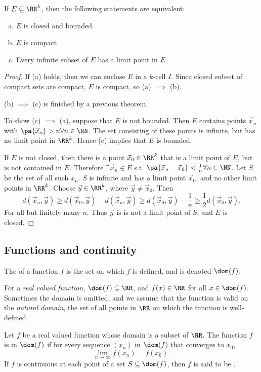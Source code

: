 \documentclass[11pt]{scrartcl}
\numberwithin{equation}{section}
\begin{document}
\begin{theorem}
    \label{thm:heineborelthm}
    If $E\subseteq \RR^k$, then the following statements are equivalent:
    \begin{enumerate}[(a)]
        \item $E$ is closed and bounded.
        \item $E$ is compact 
        \item Every infinite subset of $E$ has a limit point in $E$.
    \end{enumerate}
\end{theorem}
\begin{proof}
    If (a) holds, then we can enclose $E$ in a $k$-cell $I$.
    Since closed subset of compact sets are compact, $E$ is compact,
    so (a) $\implies$ (b).

    (b) $\implies$ (c) is finished by a previous theorem.

    To show (c) $\implies$ (a), suppose that $E$ is not bounded.
    Then $E$ contains points $\vec{x}_n$ with 
    $\pa{\vec{x}_n}>n\forall n \in \NN$. The set consisting of 
    these points is infinite, but has no limit point in $\RR^k$.
    Hence (c) implies that $E$ is bounded. 
    
    If $E$ is not closed, 
    then there is a point $\vec{x}_0\in \RR^k$ that is a limit point of $E$,
    but is not contained in $E$. Therefore $\exists \vec{x}_n\in E$ s.t.
    $\pa{\vec{x}_n-\vec{x}_0}<\frac{1}{n}\forall n \in \NN$.
    Let $S$ be the set of all such $x_n$.
    $S$ is infinite and has a limit point $\vec{x}_0$, and no other limit points in $\RR^k$. Choose $\vec{y}\in\RR^k$, where $\vec{y}\neq \vec{x}_0$.
    Then 
    \[ d(\vec{x}_n,\vec{y})\geq d(\vec{x}_0,\vec{y})-d(\vec{x}_n,\vec{y})
    \geq d(\vec{x}_0,\vec{y})-\frac{1}{n}\geq \frac{1}{2}d(\vec{x}_0,\vec{y}).\]
    For all but finitely many $n$. Thus $\vec{y}$ is is not a limit point of 
    $S$, and $E$ is closed.
\end{proof}
\subsection{Functions and continuity}
\begin{definition}
    The  of a function $f$ is the set on which $f$ is defined,
    and is denoted $\dom(f)$.
\end{definition}
For a \textit{real valued function}, $\dom(f)\subseteq \RR$, and $f(x)\in\RR$ for 
all $x\in\dom(f)$. Sometimes the domain is omitted, and we 
assume that the function is valid on the \textit{natural domain},
the set of all points in $\RR$ on which the function is well-defined.
\begin{definition}
    Let $f$ be a real valued function whose domain is a subset of $\RR$.
    The function $f$ is  in $\dom(f)$ if 
    for every sequence $(x_n)$ in $\dom(f)$ that converges 
    to $x_0$,  
    \[\lim_{n\rightarrow \infty}f(x_n)=f(x_0). \]
    If $f$ is continuous at each point of a set $S\subseteq \dom(f)$, 
    then $f$ is said to be .
\end{definition}
\clearpage
\end{document}
